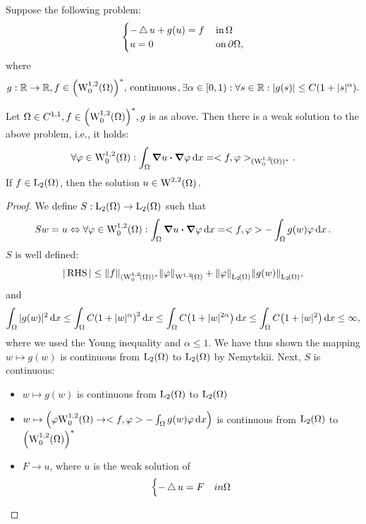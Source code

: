 \documentclass{article}
\begin{document}
\begin{example}
	Suppose the following problem: 
	\[
		\begin{cases}
			-\operatorname{\bigtriangleup} u + g(u) = f & \, \text{in} \, \Omega\\
			u = 0 & \, \text{on} \, \partial \Omega,
		\end{cases}
	\]
	where
	\[
		g: \R \to \R, f \in \qty(\WkpzeroSet[1][2]{\Omega})^{*}, \, \text{continuous} \,, \exists \alpha \in [0,1): \forall s \in \R: |g(s)|\leq C\qty(1+|s|^{\alpha}).
	\]

	\begin{theorem}[Existence]
		Let $ \Omega \in C^{1,1}, f \in \qty(\WkpzeroSet[1][2]{\Omega})^{*}, g$ is as above. Then there is a weak solution to the above problem, i.e., it holds:
		\[
			\forall \varphi \in \WkpzeroSet[1][2]{\Omega}: \int_{\Omega}\grad u \vdot \grad \varphi\dd{x} = <f,\varphi>_{(\WkpzeroSet[1][2]{\Omega})^{*}}.
		\]
		If $f \in \LpSet[2]{\Omega}$, then the solution $u \in \WkpSet[2][2]{\Omega}.$
	\end{theorem}
	\begin{proof}
		We define $S: \LpSet[2]{\Omega} \to \LpSet[2]{\Omega}$ such that
		\[
			Sw = u \Leftrightarrow \forall \varphi \in \WkpzeroSet[1][2]{\Omega}: \int_{\Omega}\grad u \vdot \grad \varphi\dd{x} = <f,\varphi> - \int_{\Omega}g(w) \varphi\dd{x}.
		\]
		$S$ is well defined:
		\[
			|\, \text{RHS} \,| \leq \norm{f}_{(\WkpzeroSet[1][2]{\Omega})^{*}} \norm{\varphi}_{\WkpSet[1][2]{\Omega}} + \norm{\varphi}_{\LpSet[2]{\Omega}} \norm{g(w)}_{\LpSet[2]{\Omega}},
		\] and
		\[
			\int_{\Omega}|g(w)|^{2}\dd{x} \leq \int_{\Omega}C\qty(1+|w|^{\alpha})^{2}\dd{x} \leq \int_{\Omega}C\qty(1+|w|^{2 \alpha})\dd{x} \leq \int_{\Omega}C\qty(1+|w|^2)\dd{x} \leq \infty,
		\]
		where we used the Young inequality and $\alpha \leq 1$. We have thus shown the mapping $w \mapsto g(w)$ is continuous from $\LpSet[2]{\Omega}$ to $\LpSet[2]{\Omega}$ by Nemytskii.
		Next, $S$ is continuous: 
		\begin{itemize}
			\item $w \mapsto g(w)$ is continuous from $\LpSet[2]{\Omega}$ to $\LpSet[2]{\Omega}$
			\item $w \mapsto \qty(\varphi \WkpzeroSet[1][2]{\Omega} \to <f,\varphi>-\int_{\Omega}g(w) \varphi\dd{x})$ is continuous from $\LpSet[2]{\Omega}$ to $\qty(\WkpzeroSet[1][2]{\Omega})^{*}$
			\item $F \to u$, where $u$ is the weak solution of
				\[
					\begin{cases}
						-\operatorname{\bigtriangleup} u = F & in \Omega \\

\end{cases}\]
\end{itemize}
\end{proof}
\end{example}
\end{document}
